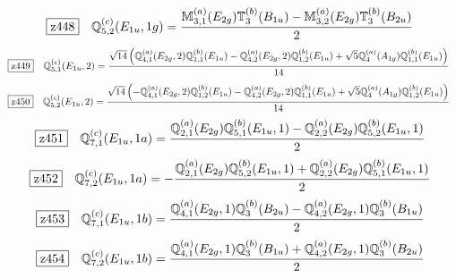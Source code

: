 \documentclass[fleqn,10pt,landscape]{jsarticle}
\begin{document}
\begin{dmath*}
\hspace*{3mm}\fbox{z448}\quad \mathbb{Q}_{5,2}^{(c)}(E_{1u},1g)=\frac{\mathbb{M}_{3,1}^{(a)}(E_{2g}) \mathbb{T}_{3}^{(b)}(B_{1u}) - \mathbb{M}_{3,2}^{(a)}(E_{2g}) \mathbb{T}_{3}^{(b)}(B_{2u})}{2}
\end{dmath*}
\begin{dmath*}
\hspace*{3mm}\fbox{z449}\quad \mathbb{Q}_{5,1}^{(c)}(E_{1u},2)=\frac{\sqrt{14} \left(\mathbb{Q}_{4,1}^{(a)}(E_{2g},2) \mathbb{Q}_{1,1}^{(b)}(E_{1u}) - \mathbb{Q}_{4,2}^{(a)}(E_{2g},2) \mathbb{Q}_{1,2}^{(b)}(E_{1u}) + \sqrt{5} \mathbb{Q}_{4}^{(a)}(A_{1g}) \mathbb{Q}_{1,1}^{(b)}(E_{1u})\right)}{14}
\end{dmath*}
\begin{dmath*}
\hspace*{3mm}\fbox{z450}\quad \mathbb{Q}_{5,2}^{(c)}(E_{1u},2)=\frac{\sqrt{14} \left(- \mathbb{Q}_{4,1}^{(a)}(E_{2g},2) \mathbb{Q}_{1,2}^{(b)}(E_{1u}) - \mathbb{Q}_{4,2}^{(a)}(E_{2g},2) \mathbb{Q}_{1,1}^{(b)}(E_{1u}) + \sqrt{5} \mathbb{Q}_{4}^{(a)}(A_{1g}) \mathbb{Q}_{1,2}^{(b)}(E_{1u})\right)}{14}
\end{dmath*}
\begin{dmath*}
\hspace*{3mm}\fbox{z451}\quad \mathbb{Q}_{7,1}^{(c)}(E_{1u},1a)=\frac{\mathbb{Q}_{2,1}^{(a)}(E_{2g}) \mathbb{Q}_{5,1}^{(b)}(E_{1u},1) - \mathbb{Q}_{2,2}^{(a)}(E_{2g}) \mathbb{Q}_{5,2}^{(b)}(E_{1u},1)}{2}
\end{dmath*}
\begin{dmath*}
\hspace*{3mm}\fbox{z452}\quad \mathbb{Q}_{7,2}^{(c)}(E_{1u},1a)=- \frac{\mathbb{Q}_{2,1}^{(a)}(E_{2g}) \mathbb{Q}_{5,2}^{(b)}(E_{1u},1) + \mathbb{Q}_{2,2}^{(a)}(E_{2g}) \mathbb{Q}_{5,1}^{(b)}(E_{1u},1)}{2}
\end{dmath*}
\begin{dmath*}
\hspace*{3mm}\fbox{z453}\quad \mathbb{Q}_{7,1}^{(c)}(E_{1u},1b)=\frac{\mathbb{Q}_{4,1}^{(a)}(E_{2g},1) \mathbb{Q}_{3}^{(b)}(B_{2u}) - \mathbb{Q}_{4,2}^{(a)}(E_{2g},1) \mathbb{Q}_{3}^{(b)}(B_{1u})}{2}
\end{dmath*}
\begin{dmath*}
\hspace*{3mm}\fbox{z454}\quad \mathbb{Q}_{7,2}^{(c)}(E_{1u},1b)=\frac{\mathbb{Q}_{4,1}^{(a)}(E_{2g},1) \mathbb{Q}_{3}^{(b)}(B_{1u}) + \mathbb{Q}_{4,2}^{(a)}(E_{2g},1) \mathbb{Q}_{3}^{(b)}(B_{2u})}{2}
\end{dmath*}
\end{document}
